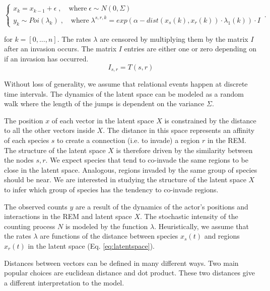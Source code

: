 \documentclass[mscthesis]{usiinfthesis}
\begin{document}
\begin{eqfloat}
\begin{equation}
    \begin{cases}
      x_k = x_{k-1} + \epsilon \; , \quad \textrm{where} \; \epsilon \sim N(0, \Sigma) \\
      y_k \sim Poi(\lambda_k) \; , \quad \textrm{where} \; \lambda^{s, r, k} = exp\left(\alpha-dist(x_s(k), x_r(k)) \cdot \lambda_1(k) \right) \cdot I
    \end{cases}\,.
\label{eq:latentspace}
\end{equation}
\end{eqfloat}

\noindent for $k = [0, ..., n]$. The rates $\lambda$ are censored by multiplying them by the matrix $I$ after an invasion occurs. The matrix $I$ entries are either one or zero depending on if an invasion has occurred.
\[
I_{s,r} = T(s,r)
\]

Without loss of generality, we assume that relational events happen at discrete time intervals. The dynamics of the latent space can be modeled as a random walk where the length of the jumps is dependent on the variance $\Sigma$.


The position $x$ of each vector in the latent space $X$ is constrained by the distance to all the other vectors inside $X$. The distance in this space represents an affinity of each species $s$ to create a connection (i.e. to invade) a region $r$ in the REM. The structure of the latent space $X$ is therefore driven by the similarity between the nodes $s, r$. We expect species that tend to co-invade the same regions to be close in the latent space. Analogous, regions invaded by the same group of species should be near. We are interested in studying the structure of the latent space $X$ to infer which group of species has the tendency to co-invade regions.


The observed counts $y$ are a result of the dynamics of the actor's positions and interactions in the REM and latent space $X$. The stochastic intensity of the counting process $N$ is modeled by the function $\lambda$. Heuristically, we assume that the rates $\lambda$ are functions of the distance between species $x_s(t)$ and regions $x_r(t)$ in the latent space (Eq. \ref{eq:latentspace}). 

Distances between vectors can be defined in many different ways. Two main popular choices are euclidean distance and dot product. These two distances give a different interpretation to the model. 
\end{document}
